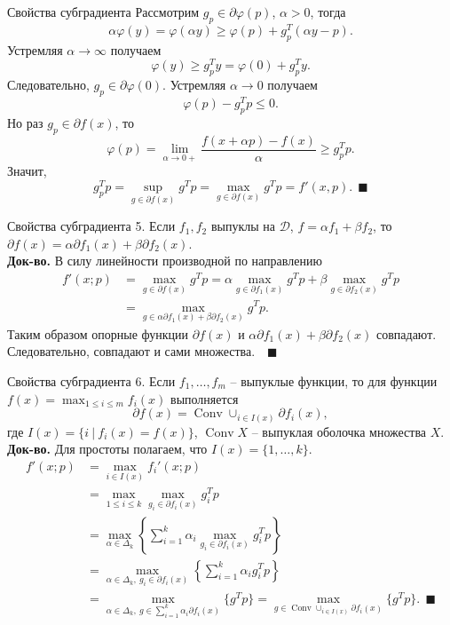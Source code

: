 \documentclass[10pt, handout]{beamer}
\DeclareMathOperator{\conv}{Conv}
\begin{document}
\begin{frame}{Свойства субградиента}
Рассмотрим $g_p\in \partial \varphi(p)$, $\alpha>0$, тогда
$$
\alpha \varphi(y)=\varphi(\alpha y)\geq \varphi(p)+g_p^T(\alpha y-p).
$$
\pause
Устремляя $\alpha\rightarrow\infty$ получаем
$$
\varphi(y)\geq g_p^Ty=\varphi(0)+g_p^Ty.
$$
Следовательно, $g_p\in \partial \varphi(0)$. \pause Устремляя $\alpha\rightarrow 0$ получаем
$$
\varphi(p)-g_p^Tp\leq 0.
$$
Но раз $g_p\in \partial f(x)$, то
$$
\varphi(p)=\lim_{\alpha\rightarrow 0+}\frac{f(x+\alpha p)-f(x)}{\alpha}\geq g_p^Tp.
$$
Значит,
$$
g_p^Tp=\sup_{g\in \partial f(x)}g^Tp=\max_{g\in \partial f(x)}g^Tp=f'(x,p).~~\blacksquare
$$
\end{frame}

\begin{frame}{Свойства субградиента}
5. Если $f_1, f_2$ выпуклы на $\mathcal{D}$, $f=\alpha f_1+\beta f_2$, то $\partial f(x)=\alpha\partial f_1(x)+\beta \partial f_2(x)$.\\
\vspace{1em}
\pause
\textbf{Док-во.} В силу линейности производной по направлению
\begin{align*}
f'(x;p)&=\max_{g\in \partial f(x)}g^Tp=\alpha\max_{g\in\partial f_1(x)}g^Tp+\beta\max_{g\in \partial f_2(x)}g^Tp\\
&=\max_{g\in \alpha\partial f_1(x)+\beta \partial f_2(x)}g^Tp.
\end{align*}
\pause
Таким образом опорные функции $\partial f(x)$ и $\alpha\partial f_1(x)+\beta\partial f_2(x)$ совпадают. Следовательно, совпадают и сами множества.~~$\blacksquare$
\end{frame}

\begin{frame}{Свойства субградиента}
6. Если $f_1, \ldots, f_m$ -- выпуклые функции, то для функции $f(x)=\max_{1\leq i\leq m}f_i(x)$ выполняется
$$
\partial f(x)=\conv\cup_{i\in I(x)}\partial f_i(x),
$$
где $I(x)=\{i~|~f_i(x)=f(x)\}$, $\conv X$ -- выпуклая оболочка множества $X$. \\
\pause
\vspace{1em}
\textbf{Док-во.} Для простоты полагаем, что $I(x)=\{1, \ldots, k\}$.
\begin{align*}
f'(x; p)&=\max_{i\in I(x)}f_i'(x;p)\\
&=\max_{1\leq i\leq k}\max_{g_i\in \partial f_i(x)}g_i^Tp\\
&=\max_{\alpha\in \Delta_k}\left\{\sum_{i=1}^k\alpha_i\max_{g_i\in \partial f_i(x)}g_i^Tp\right\}\\
&=\max_{\alpha\in \Delta_k,~g_i\in \partial f_i(x)}\left\{\sum_{i=1}^k\alpha_ig_i^Tp\right\}\\
&=\max_{\alpha\in \Delta_k,~g\in \sum_{i=1}^k\alpha_i\partial f_i(x)}\{g^Tp\}=\max_{g\in\conv\cup_{i\in I(x)}\partial f_i(x)}\{g^Tp\}. ~~\blacksquare
\end{align*}
\end{frame}
\end{document}
